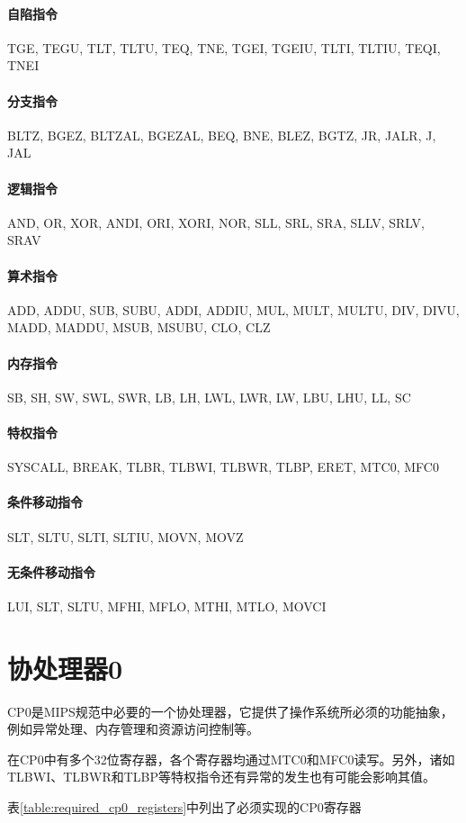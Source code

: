 \paragraph{自陷指令} TGE, TEGU, TLT, TLTU, TEQ, TNE, TGEI, TGEIU, TLTI, TLTIU, TEQI, TNEI
\paragraph{分支指令} BLTZ, BGEZ, BLTZAL, BGEZAL, BEQ, BNE, BLEZ, BGTZ, JR, JALR, J, JAL
\paragraph{逻辑指令} AND, OR, XOR, ANDI, ORI, XORI, NOR, SLL, SRL, SRA, SLLV, SRLV, SRAV
\paragraph{算术指令} ADD, ADDU, SUB, SUBU, ADDI, ADDIU, MUL, MULT, MULTU, DIV, DIVU, MADD, MADDU, MSUB, MSUBU, CLO, CLZ
\paragraph{内存指令} SB, SH, SW, SWL, SWR, LB, LH, LWL, LWR, LW, LBU, LHU, LL, SC
\paragraph{特权指令} SYSCALL, BREAK, TLBR, TLBWI, TLBWR, TLBP, ERET, MTC0, MFC0
\paragraph{条件移动指令} SLT, SLTU, SLTI, SLTIU, MOVN, MOVZ
\paragraph{无条件移动指令} LUI, SLT, SLTU, MFHI, MFLO, MTHI, MTLO, MOVCI

\section{协处理器0}
CP0是MIPS规范中必要的一个协处理器，它提供了操作系统所必须的功能抽象，例如异常处理、内存管理和资源访问控制等。

在CP0中有多个32位寄存器，各个寄存器均通过MTC0和MFC0读写。另外，诸如TLBWI、TLBWR和TLBP等特权指令还有异常的发生也有可能会影响其值。

表\ref{table:required_cp0_registers}中列出了必须实现的CP0寄存器

